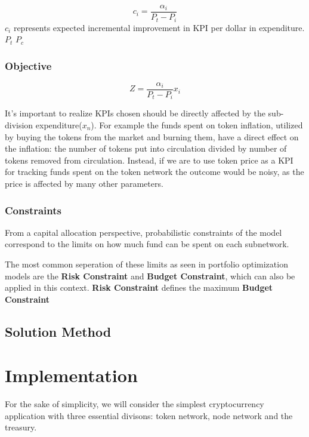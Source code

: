 \documentclass[conference,letterpaper]{IEEEtran}
\begin{document}
                \[c_i = \frac{\alpha_i}{P_t - P_i}\] $c_i$ represents expected incremental
                improvement in KPI per dollar in expenditure. $P_t$ $P_c$
                

            \subsubsection{Objective}
                
                \[Z = \frac{\alpha_i}{P_t - P_i} x_i\] 

                It's important to realize KPIs chosen should be directly affected by the
                sub-division expenditure($x_n$). For example the funds spent on token
                inflation, utilized by buying the tokens from the market and burning them,
                have a direct effect on the inflation: the number of tokens put into
                circulation divided by number of tokens removed from circulation. Instead,
                if we are to use token price as a KPI for tracking funds spent on the
                token network the outcome would be noisy, as the price is affected by many
                other parameters.
                \newline

            \subsubsection{Constraints}

            From a capital allocation perspective, probabilistic constraints of the model
            correspond to the limits on how much fund can be spent on each subnetwork.


            The most common seperation of these limits as seen in portfolio optimization
            models are the \textbf{Risk Constraint} and \textbf{Budget Constraint}, which
            can also be applied in this context. \textbf{Risk Constraint} defines the
            maximum 
            \textbf{Budget Constraint}

            \subsection{Solution Method}

    \section{Implementation}
        For the sake of simplicity, we will consider the simplest cryptocurrency
        application with three essential divisons: token network, node network and the
        treasury. 
\end{document}
